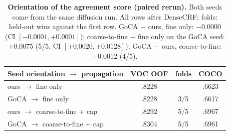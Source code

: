 \begin{table}[t]
\centering
\footnotesize\setlength{\tabcolsep}{3pt}
\begin{tabular}{@{}lccc@{}}
\toprule
Seed orientation $\rightarrow$ propagation & VOC OOF & folds & COCO \\
\midrule
ours $\rightarrow$ fine only & .8228 & -- & .6623 \\
GoCA $\rightarrow$ fine only & .8228 & 3/5 & .6617 \\
ours $\rightarrow$ coarse-to-fine + cap & .8292 & 5/5 & .6967 \\
GoCA $\rightarrow$ coarse-to-fine + cap & .8304 & 5/5 & .6961 \\
\bottomrule
\end{tabular}
\caption{\textbf{Orientation of the agreement score (paired rerun).} Both seeds come from the same diffusion run. All rows after DenseCRF; folds: held-out wins against the first row. GoCA $-$ ours, fine only: $-0.0000$ (CI $[-0.0001,+0.0001]$); coarse-to-fine $-$ fine only on the GoCA seed: $+0.0075$ (5/5, CI $[+0.0020,+0.0128]$); GoCA $-$ ours, coarse-to-fine: $+0.0012$ (4/5).}
\label{tab:supp_a3g}
\end{table}
